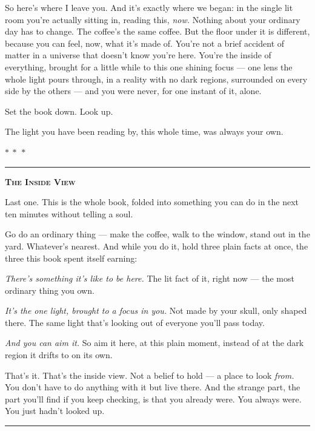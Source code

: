 \documentclass[11pt,openany]{book}
\begin{document}
So here’s where I leave you. And it’s exactly where we began: in the single lit room you’re actually sitting in, reading this, \textit{now.} Nothing about your ordinary day has to change. The coffee’s the same coffee. But the floor under it is different, because you can feel, now, what it’s made of. You’re not a brief accident of matter in a universe that doesn’t know you’re here. You’re the inside of everything, brought for a little while to this one shining focus — one lens the whole light pours through, in a reality with no dark regions, surrounded on every side by the others — and you were never, for one instant of it, alone.

Set the book down. Look up.

The light you have been reading by, this whole time, was always your own.


\medskip\begin{center}\textcolor{rule}{$\ast\ \ast\ \ast$}\end{center}\medskip


\bigskip
{\par\noindent\color{rule}\rule{\linewidth}{0.8pt}}\par\smallskip
{\centering\scshape\bfseries The Inside View\par}\smallskip
\begingroup\setlength{\parindent}{0pt}\setlength{\parskip}{0.6em}
Last one. This is the whole book, folded into something you can do in the next ten minutes without telling a soul.

Go do an ordinary thing — make the coffee, walk to the window, stand out in the yard. Whatever’s nearest. And while you do it, hold three plain facts at once, the three this book spent itself earning:

\textit{There’s something it’s like to be here.} The lit fact of it, right now — the most ordinary thing you own.

\textit{It’s the one light, brought to a focus in you.} Not made by your skull, only shaped there. The same light that’s looking out of everyone you’ll pass today.

\textit{And you can aim it.} So aim it here, at this plain moment, instead of at the dark region it drifts to on its own.

That’s it. That’s the inside view. Not a belief to hold — a place to look \textit{from.} You don’t have to do anything with it but live there. And the strange part, the part you’ll find if you keep checking, is that you already were. You always were. You just hadn’t looked up.
\endgroup\par\smallskip
{\noindent\color{rule}\rule{\linewidth}{0.8pt}}
\bigskip
\end{document}

